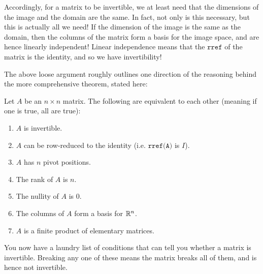 \documentclass{ximera}
\begin{document}
Accordingly, for a matrix to be invertible, we at least need that the dimensions of the image and the domain are the same. In fact, not only is this necessary, but this is actually all we need! If the dimension of the image is the same as the domain, then the columns of the matrix form a basis for the image space, and are hence linearly independent! Linear independence means that the $\texttt{rref}$ of the matrix is the identity, and so we have invertibility! 

The above loose argument roughly outlines one direction of the reasoning behind the more comprehensive theorem, stated here:

\begin{theorem}
  Let $A$ be an $n\times n$ matrix. The following are equivalent to each other (meaning if one is true, all are true):
  \begin{enumerate}
    \item $A$ is invertible.
    \item $A$ can be row-reduced to the identity (i.e. $\texttt{rref(A)}$ is $I$).
    \item $A$ has $n$ pivot positions.
    \item The rank of $A$ is $n$.
    \item The nullity of $A$ is $0$.
    \item The columns of $A$ form a basis for $\mathbb{R}^n$.
    \item $A$ is a finite product of elementary matrices.
  \end{enumerate}
\end{theorem}

You now have a laundry list of conditions that can tell you whether a matrix is invertible. Breaking any one of these means the matrix breaks all of them, and is hence not invertible.
 
\end{document}
